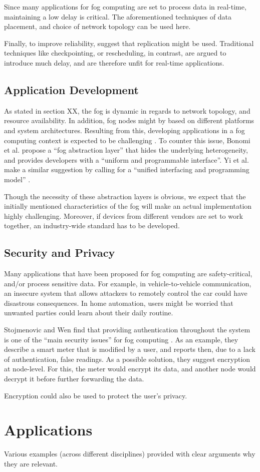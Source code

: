 \documentclass{article}
\begin{document}
Since many applications for fog computing are set to process data in real-time, maintaining a low delay is critical. The aforementioned techniques of data placement, and choice of network topology can be used here.

Finally, to improve reliability, \cite{yi2015survey} suggest that replication might be used. Traditional techniques like checkpointing, or rescheduling, in contrast, are argued to introduce much delay, and are therefore unfit for real-time applications.

\subsection{Application Development}
As stated in section XX, the fog is dynamic in regards to network topology, and resource availability. In addition, fog nodes might by based on different platforms and system architectures. Resulting from this, developing applications in a fog computing context is expected to be challenging \cite{yi2015survey}. To counter this issue, Bonomi et al. \cite{bonomi2014fog} propose a ``fog abstraction layer'' that hides the underlying heterogeneity, and provides developers with a ``uniform and programmable interface''. Yi et al. make a similar suggestion by calling for a ``unified interfacing and programming model'' \cite{yi2015survey}.

Though the necessity of these abstraction layers is obvious, we expect that the initially mentioned characteristics of the fog will make an actual implementation highly challenging. Moreover, if devices from different vendors are set to work together, an industry-wide standard has to be developed.

\subsection{Security and Privacy}
Many applications that have been proposed for fog computing are safety-critical, and/or process sensitive data. For example, in vehicle-to-vehicle communication, an insecure system that allows attackers to remotely control the car could have disastrous consequences. In home automation, users might be worried that unwanted parties could learn about their daily routine.

Stojmenovic and Wen \cite{stojmenovic2014fog} find that providing authentication throughout the system is one of the ``main security issues'' for fog computing . As an example, they describe a smart meter that is modified by a user, and reports then, due to a lack of authentication, false readings. As a possible solution, they suggest encryption at node-level. For this, the meter would encrypt its data, and another node would decrypt it before further forwarding the data.

Encryption could also be used to protect the user's privacy.


\section{Applications}
Various examples (across different disciplines) provided with clear arguments why they are relevant.

\renewcommand{\refname}{\section{References}}


\end{document}
